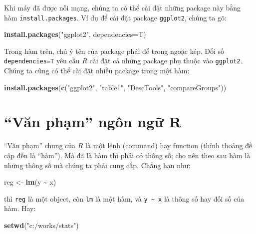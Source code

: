 \documentclass[
]{book}
\newenvironment{Shaded}{\begin{snugshade}}{\end{snugshade}}
\newcommand{\DataTypeTok}[1]{\textcolor[rgb]{0.13,0.29,0.53}{#1}}
\newcommand{\KeywordTok}[1]{\textcolor[rgb]{0.13,0.29,0.53}{\textbf{#1}}}
\newcommand{\NormalTok}[1]{#1}
\newcommand{\OperatorTok}[1]{\textcolor[rgb]{0.81,0.36,0.00}{\textbf{#1}}}
\newcommand{\StringTok}[1]{\textcolor[rgb]{0.31,0.60,0.02}{#1}}
\begin{document}
Khi máy đã được nối mạng, chúng ta có thể cài đặt những package này bằng hàm \texttt{install.packages}. Ví dụ để cài đặt package \texttt{ggplot2}, chúng ta gõ:

\begin{Shaded}
\begin{Highlighting}[]
\KeywordTok{install.packages}\NormalTok{(}\StringTok{"ggplot2"}\NormalTok{, }\DataTypeTok{dependencies=}\NormalTok{T)}
\end{Highlighting}
\end{Shaded}

Trong hàm trên, chú ý tên của package phải để trong ngoặc kép. Đối số \texttt{dependencies=T} yêu cầu \(R\) cài đặt cả những package phụ thuộc vào \texttt{ggplot2}. Chúng ta cũng có thể cài đặt nhiều package trong một hàm:

\begin{Shaded}
\begin{Highlighting}[]
\KeywordTok{install.packages}\NormalTok{(}\KeywordTok{c}\NormalTok{(}\StringTok{"ggplot2"}\NormalTok{, }\StringTok{"table1"}\NormalTok{, }\StringTok{"DescTools"}\NormalTok{, }\StringTok{"compareGroups"}\NormalTok{))}
\end{Highlighting}
\end{Shaded}

\hypertarget{vux103n-phux1ea1m-nguxf4n-ngux1eef-r}{%
\section{``Văn phạm'' ngôn ngữ R}\label{vux103n-phux1ea1m-nguxf4n-ngux1eef-r}}

``Văn phạm'' chung của \(R\) là một lệnh (command) hay function (thỉnh thoảng đề cập đến là ``hàm''). Mà đã là hàm thì phải có thông số; cho nên theo sau hàm là những thông số mà chúng ta phải cung cấp. Chẳng hạn như:

\begin{Shaded}
\begin{Highlighting}[]
\NormalTok{reg \textless{}{-}}\StringTok{ }\KeywordTok{lm}\NormalTok{(y }\OperatorTok{\textasciitilde{}}\StringTok{ }\NormalTok{x) }
\end{Highlighting}
\end{Shaded}

thì \texttt{reg} là một object, còn \texttt{lm} là một hàm, và \texttt{y\ \textasciitilde{}\ x} là thông số hay đối số của hàm. Hay:

\begin{Shaded}
\begin{Highlighting}[]
\KeywordTok{setwd}\NormalTok{(}\StringTok{"c:/works/stats"}\NormalTok{)}
\end{Highlighting}
\end{Shaded}
\end{document}
